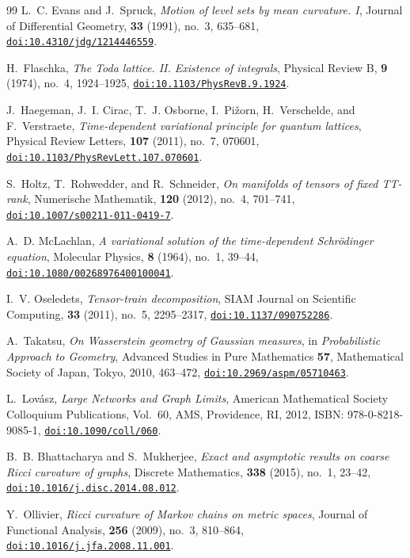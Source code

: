 \documentclass[11pt,a4paper,reqno]{amsart}
\theoremstyle{definition}
\numberwithin{equation}{section}
\providecommand{\doi}[1]{\href{https://doi.org/#1}{\texttt{doi:#1}}}
\begin{document}
\begin{thebibliography}{99}
L.~C. Evans and J.~Spruck,
\emph{Motion of level sets by mean curvature. I},
Journal of Differential Geometry, \textbf{33} (1991), no.~3, 635--681,
\doi{10.4310/jdg/1214446559}.

H.~Flaschka,
\emph{The Toda lattice. II. Existence of integrals},
Physical Review B, \textbf{9} (1974), no.~4, 1924--1925,
\doi{10.1103/PhysRevB.9.1924}.

J.~Haegeman, J.~I. Cirac, T.~J. Osborne, I.~Pi{\v{z}}orn, H.~Verschelde, and F.~Verstraete,
\emph{Time-dependent variational principle for quantum lattices},
Physical Review Letters, \textbf{107} (2011), no.~7, 070601,
\doi{10.1103/PhysRevLett.107.070601}.

S.~Holtz, T.~Rohwedder, and R.~Schneider,
\emph{On manifolds of tensors of fixed TT-rank},
Numerische Mathematik, \textbf{120} (2012), no.~4, 701--741,
\doi{10.1007/s00211-011-0419-7}.

A.~D. McLachlan,
\emph{A variational solution of the time-dependent Schr\"odinger equation},
Molecular Physics, \textbf{8} (1964), no.~1, 39--44,
\doi{10.1080/00268976400100041}.

I.~V. Oseledets,
\emph{Tensor-train decomposition},
SIAM Journal on Scientific Computing, \textbf{33} (2011), no.~5, 2295--2317,
\doi{10.1137/090752286}.

A.~Takatsu,
\emph{On Wasserstein geometry of Gaussian measures},
in \emph{Probabilistic Approach to Geometry}, Advanced Studies in Pure Mathematics \textbf{57}, Mathematical Society of Japan, Tokyo, 2010, 463--472,
\doi{10.2969/aspm/05710463}.

L.~Lov{\'a}sz,
\emph{Large Networks and Graph Limits},
American Mathematical Society Colloquium Publications, Vol.~60, AMS, Providence, RI, 2012,
ISBN: 978-0-8218-9085-1,
\doi{10.1090/coll/060}.

B.~B. Bhattacharya and S.~Mukherjee,
\emph{Exact and asymptotic results on coarse Ricci curvature of graphs},
Discrete Mathematics, \textbf{338} (2015), no.~1, 23--42,
\doi{10.1016/j.disc.2014.08.012}.

Y.~Ollivier,
\emph{Ricci curvature of Markov chains on metric spaces},
Journal of Functional Analysis, \textbf{256} (2009), no.~3, 810--864,
\doi{10.1016/j.jfa.2008.11.001}.


\end{thebibliography}
\end{document}
